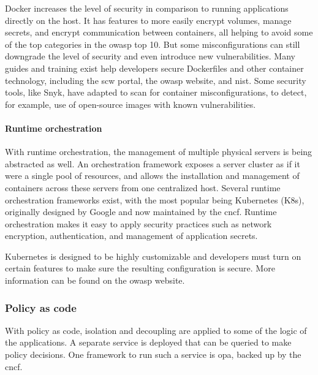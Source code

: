 Docker increases the level of security in comparison to running applications directly on the host.
It has features to more easily encrypt volumes, manage secrets, and encrypt communication between containers, all helping to avoid some of the top categories in the \gls{owasp} top 10.
But some misconfigurations can still downgrade the level of security and even introduce new vulnerabilities.
Many guides and training exist help developers secure Dockerfiles and other container technology, including the \gls{scw} portal, the \gls{owasp} website, and \gls{nist}.
Some security tools, like Snyk, have adapted to scan for container misconfigurations, to detect, for example, use of open-source images with known vulnerabilities.

\paragraph{Runtime orchestration}
With runtime orchestration, the management of multiple physical servers is being abstracted as well.
An orchestration framework exposes a server cluster as if it were a single pool of resources, and allows the installation and management of containers across these servers from one centralized host.
Several runtime orchestration frameworks exist, with the most popular being Kubernetes (K8s), originally designed by Google and now maintained by the 
\gls{cncf}.
Runtime orchestration makes it easy to apply security practices such as network encryption, authentication, and management of application secrets. 

Kubernetes is designed to be highly customizable and developers must turn on certain features to make sure the resulting configuration is secure.
More information can be found on the \gls{owasp} website.

\subsubsection{Policy as code}
With policy as code, isolation and decoupling are applied to some of the logic of the applications.
A separate service is deployed that can be queried to make policy decisions.
One framework to run such a service is \gls{opa}, backed up by the \gls{cncf}.


